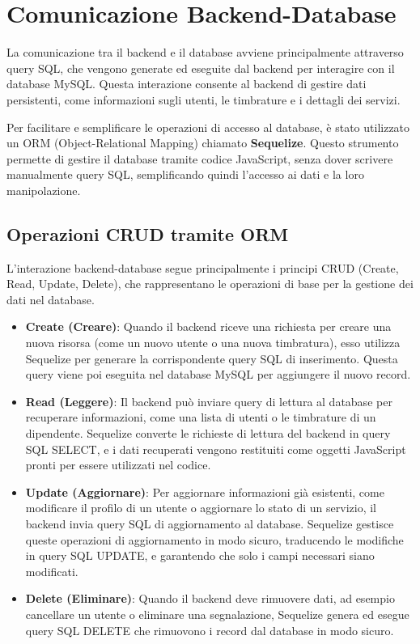 \documentclass[twoside]{supsistudent}
\begin{document}
\section{Comunicazione Backend-Database}

La comunicazione tra il backend e il database avviene principalmente attraverso query SQL, che vengono generate ed eseguite dal backend per interagire con il database MySQL. Questa interazione consente al backend di gestire dati persistenti, come informazioni sugli utenti, le timbrature e i dettagli dei servizi.

Per facilitare e semplificare le operazioni di accesso al database, è stato utilizzato un ORM (Object-Relational Mapping) chiamato \textbf{Sequelize}\cite{sequelize}. Questo strumento permette di gestire il database tramite codice JavaScript, senza dover scrivere manualmente query SQL, semplificando quindi l'accesso ai dati e la loro manipolazione.

\subsection{Operazioni CRUD tramite ORM}

L'interazione backend-database segue principalmente i principi CRUD (Create, Read, Update, Delete), che rappresentano le operazioni di base per la gestione dei dati nel database.

\begin{itemize}
  \item \textbf{Create (Creare)}: Quando il backend riceve una richiesta per creare una nuova risorsa (come un nuovo utente o una nuova timbratura), esso utilizza Sequelize per generare la corrispondente query SQL di inserimento. Questa query viene poi eseguita nel database MySQL per aggiungere il nuovo record.

  \item \textbf{Read (Leggere)}: Il backend può inviare query di lettura al database per recuperare informazioni, come una lista di utenti o le timbrature di un dipendente. Sequelize converte le richieste di lettura del backend in query SQL SELECT, e i dati recuperati vengono restituiti come oggetti JavaScript pronti per essere utilizzati nel codice.

  \item \textbf{Update (Aggiornare)}: Per aggiornare informazioni già esistenti, come modificare il profilo di un utente o aggiornare lo stato di un servizio, il backend invia query SQL di aggiornamento al database. Sequelize gestisce queste operazioni di aggiornamento in modo sicuro, traducendo le modifiche in query SQL UPDATE, e garantendo che solo i campi necessari siano modificati.

  \item \textbf{Delete (Eliminare)}: Quando il backend deve rimuovere dati, ad esempio cancellare un utente o eliminare una segnalazione, Sequelize genera ed esegue query SQL DELETE che rimuovono i record dal database in modo sicuro.
\end{itemize}
\end{document}
